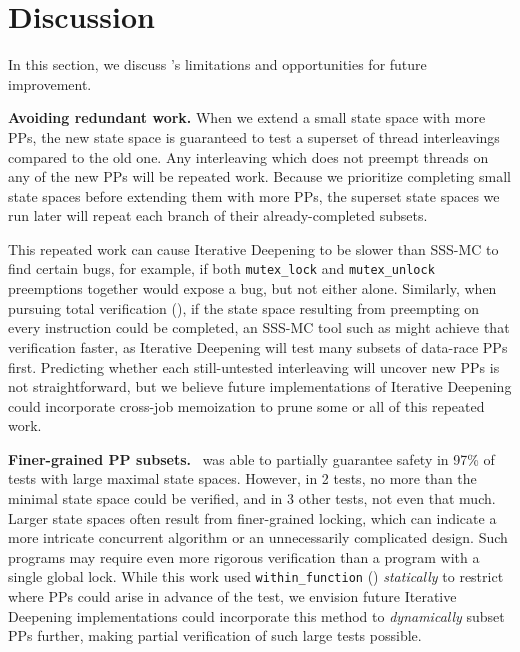 
\section{Discussion}
\label{sec:future}

In this section, we discuss \quicksand's limitations and opportunities for future improvement.

{\bf Avoiding redundant work.}
When we extend a small state space with more PPs, the new state space is guaranteed to test a superset of thread interleavings compared to the old one.
Any interleaving which does not preempt threads on any of the new PPs will be repeated work.
Because we prioritize completing small state spaces before extending them with more PPs,
the superset state spaces we run later will repeat each branch of their already-completed subsets.
%

This repeated work can cause Iterative Deepening to be slower than SSS-MC to find certain bugs,
for example, if both {\tt mutex\_lock} and {\tt mutex\_unlock} preemptions together would expose a bug, but not either alone.
Similarly, when pursuing total verification (\sect{\ref{sec:totalverif}}),
if the state space resulting from preempting on every instruction could be completed,
an SSS-MC tool such as \cite{spin} might achieve that verification faster,
as Iterative Deepening will test many subsets of data-race PPs first.
Predicting whether each still-untested interleaving will uncover new PPs is not straightforward,
but we believe future implementations of Iterative Deepening could incorporate cross-job memoization
to prune some or all of this repeated work.

{\bf Finer-grained PP subsets.}
\quicksand~was able to partially guarantee safety in 97\% of tests with large maximal state spaces.
However, in 2 tests, no more than the minimal state space could be verified,
and in 3 other tests, not even that much.
Larger state spaces often result from finer-grained locking,
which can indicate a more intricate concurrent algorithm or an unnecessarily complicated design.
Such programs may require even more rigorous verification than a program with a single global lock.
While this work used {\tt within\_function} (\sect{\ref{sec:landslide}}) {\em statically} to restrict where PPs could arise in advance of the test,
we envision future Iterative Deepening implementations could incorporate this method to {\em dynamically} subset PPs further,
making partial verification of such large tests possible.

